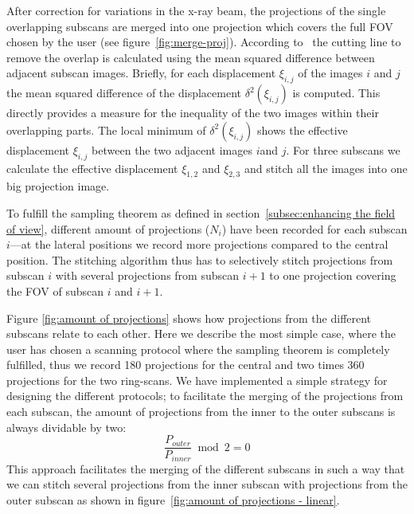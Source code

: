 After correction for variations in the x-ray beam, the projections of the single overlapping subscans are merged into one projection which covers the full FOV chosen by the user (see figure~\ref{fig:merge-proj}). According to~\citet{Hintermueller2009} the cutting line to remove the overlap is calculated using the mean squared difference between adjacent subscan images. Briefly, for each displacement $\xi_{i,j}$ of the images $i$ and $j$ the mean squared difference of the displacement $\delta^2(\xi_{i,j})$ is computed. This directly provides a measure for the inequality of the two images within their overlapping parts. The local minimum of $\delta^2(\xi_{i,j})$ shows the effective displacement $\xi_{i,j}$ between the two adjacent images $i$and $j$. For three subscans we calculate the effective displacement $\xi_{1,2}$ and $\xi_{2,3}$ and stitch all the images into one big projection image.

To fulfill the sampling theorem as defined in section~\ref{subsec:enhancing the field of view}, different amount of projections ($N_{i}$) have been recorded for each subscan $i$---at the lateral positions we record more projections compared to the central position. The stitching algorithm thus has to selectively stitch projections from subscan $i$ with several projections from subscan $i+1$ to one projection covering the FOV of subscan $i$ and $i+1$.

Figure \ref{fig:amount of projections} shows how projections from the different subscans relate to each other. Here we describe the most simple case, where the user has chosen a scanning protocol where the sampling theorem is completely fulfilled, thus we record 180 projections for the central and two times 360 projections for the two ring-scans. We have implemented a simple strategy for designing the different protocols; to facilitate the merging of the projections from each subscan, the amount of projections from the inner to the outer subscans is always dividable by two: 
\begin{equation}
	\frac{P_{outer}}{P_{inner}} \bmod 2 = 0
\label{eq:Modulo}
\end{equation}
This approach facilitates the merging of the different subscans in such a way that we can stitch several projections from the inner subscan with projections from the outer subscan as shown in figure~\ref{fig:amount of projections - linear}.

